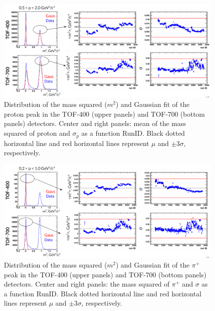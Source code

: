     \begin{figure}[H]
        \begin{center}
            \includegraphics[width=0.9\linewidth]{../pict/QA_RunByRun_24.12/proton_m2.png}
            \vspace{-3mm}
            \caption{Distribution of the mass squared ($m^2$) and Gaussian fit of the proton peak in the TOF-400 (upper panels) and TOF-700 (bottom panels) detectors. Center and right panels: mean of the mass squared of proton and $\sigma_{p}$ as a function RunID. Black dotted horizontal line and red horizontal lines represent $\mu$ and $\pm3\sigma$, respectively. }
        \end{center}
        \label{mass2_proton}
        \vspace{-5mm}
    \end{figure}

    \begin{figure}[H]
        \begin{center}
            \includegraphics[width=0.9\linewidth]{../pict/QA_RunByRun_24.12/pion_plus_m2.png}
            \vspace{-3mm}
            \caption{Distribution of the mass squared ($m^2$) and Gaussian fit of the $\pi^{+}$ peak in the TOF-400 (upper panels) and TOF-700 (bottom panels) detectors. Center and right panels: the mass squared of $\pi^{+}$ and $\sigma$ as a function RunID. Black dotted horizontal line and red horizontal lines represent $\mu$ and $\pm3\sigma$, respectively.}
        \end{center}
        \label{mass2_proton}
        \vspace{-5mm}
    \end{figure}


